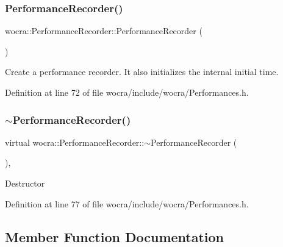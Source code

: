 \subsubsection{\texorpdfstring{Performance\+Recorder()}{PerformanceRecorder()}}
{\footnotesize\ttfamily wocra\+::\+Performance\+Recorder\+::\+Performance\+Recorder (\begin{DoxyParamCaption}{ }\end{DoxyParamCaption})\hspace{0.3cm}{\ttfamily [inline]}}

Create a performance recorder. It also initializes the internal initial time. 

Definition at line 72 of file wocra/include/wocra/\+Performances.\+h.

\hypertarget{classwocra_1_1PerformanceRecorder_ae686b34e1d7e0e3a80c7ee0df012e441}{}\label{classwocra_1_1PerformanceRecorder_ae686b34e1d7e0e3a80c7ee0df012e441} 
\subsubsection{\texorpdfstring{$\sim$\+Performance\+Recorder()}{~PerformanceRecorder()}}
{\footnotesize\ttfamily virtual wocra\+::\+Performance\+Recorder\+::$\sim$\+Performance\+Recorder (\begin{DoxyParamCaption}{ }\end{DoxyParamCaption})\hspace{0.3cm}{\ttfamily [inline]}, {\ttfamily [virtual]}}

Destructor 

Definition at line 77 of file wocra/include/wocra/\+Performances.\+h.



\subsection{Member Function Documentation}
\hypertarget{classwocra_1_1PerformanceRecorder_aca4cee19319252b823be15e1f217825e}{}\label{classwocra_1_1PerformanceRecorder_aca4cee19319252b823be15e1f217825e} 
